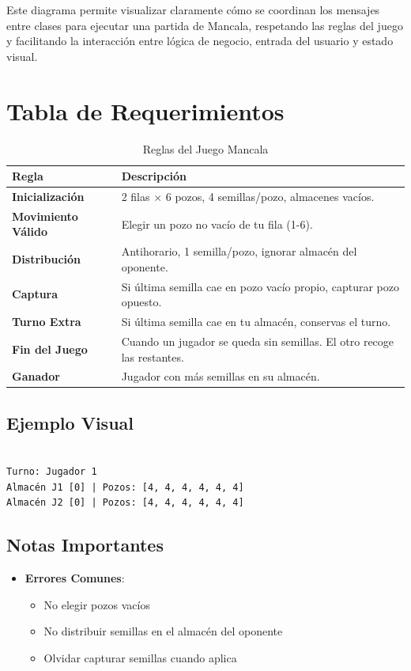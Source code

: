 \documentclass{article}
\begin{document}
Este diagrama permite visualizar claramente cómo se coordinan los mensajes entre clases para ejecutar una partida de Mancala, respetando las reglas del juego y facilitando la interacción entre lógica de negocio, entrada del usuario y estado visual.

\newpage
\section{Tabla de Requerimientos}
\begin{table}[h]
\centering
\caption{Reglas del Juego Mancala}
\label{tab:reglas}
\begin{tabular}{|>{\centering\arraybackslash}p{3cm}|p{9cm}|}
\hline
\rowcolor[gray]{0.9}
\textbf{Regla} & \textbf{Descripción} \\
\hline
\textbf{Inicialización} & 2 filas × 6 pozos, 4 semillas/pozo, almacenes vacíos. \\ 
\hline
\textbf{Movimiento Válido} & Elegir un pozo no vacío de tu fila (1-6). \\
\hline
\textbf{Distribución} & Antihorario, 1 semilla/pozo, ignorar almacén del oponente. \\
\hline
\textbf{Captura} & Si última semilla cae en pozo vacío propio, capturar pozo opuesto. \\
\hline
\textbf{Turno Extra} & Si última semilla cae en tu almacén, conservas el turno. \\
\hline
\textbf{Fin del Juego} & Cuando un jugador se queda sin semillas. El otro recoge las restantes. \\
\hline
\textbf{Ganador} & Jugador con más semillas en su almacén. \\
\hline
\end{tabular}
\end{table}


\subsection{Ejemplo Visual}

\begin{verbatim}

Turno: Jugador 1
Almacén J1 [0] | Pozos: [4, 4, 4, 4, 4, 4]
Almacén J2 [0] | Pozos: [4, 4, 4, 4, 4, 4]
\end{verbatim}

\subsection{Notas Importantes}
\begin{itemize}
    \item \textbf{Errores Comunes}:
    \begin{itemize}
        \item No elegir pozos vacíos
        \item No distribuir semillas en el almacén del oponente
        \item Olvidar capturar semillas cuando aplica
    \end{itemize}
\end{itemize}
\end{document}
